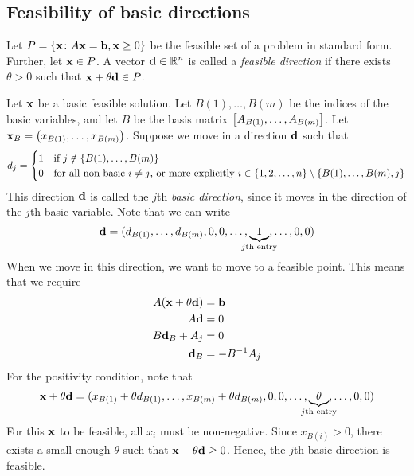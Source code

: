 \subsection{Feasibility of basic directions}
\begin{definition}
	Let \( P = \qty{\vb x \colon A \vb x = \vb b, \vb x \geq 0} \) be the feasible set of a problem in standard form.
	Further, let \( \vb x \in P \).
	A vector \( \vb d \in \mathbb R^n \) is called a \textit{feasible direction} if there exists \( \theta > 0 \) such that \( \vb x + \theta \vb d \in P \).
\end{definition}
Let \( \vb x \) be a basic feasible solution.
Let \( B(1), \dots, B(m) \) be the indices of the basic variables, and let \( B \) be the basis matrix \( \qty[A_{B(1)}, \dots, A_{B(m)}] \).
Let \( \vb x_B = \qty(x_{B(1)}, \dots, x_{B(m)}) \).
Suppose we move in a direction \( \vb d \) such that
\[
	d_j = \begin{cases}
		1 & \text{if } j \notin \qty{B(1), \dots, B(m)}                                                                             \\
		0 & \text{for all non-basic } i \neq j \text{, or more explicitly } i \in \qty{1,2,\dots,n}\setminus\qty{B(1),\dots,B(m),j} \\
	\end{cases}
\]
This direction \( \vb d \) is called the \( j \)th \textit{basic direction}, since it moves in the direction of the \( j \)th basic variable.
Note that we can write
\[
	\vb d = (d_{B(1)}, \dots, d_{B(m)}, 0, 0, \dots, \underbrace{1}_{\mathclap{j\text{th entry}}}, \dots, 0, 0)
\]
When we move in this direction, we want to move to a feasible point.
This means that we require
\begin{align*}
	A(\vb x + \theta \vb d) & = \vb b      \\
	A\vb d                  & = 0          \\
	B\vb d_B + A_j          & = 0          \\
	\vb d_B                 & = -B^{-1}A_j
\end{align*}
For the positivity condition, note that
\[
	\vb x + \theta \vb d = (x_{B(1)}+\theta d_{B(1)}, \dots, x_{B(m)}+\theta d_{B(m)}, 0, 0, \dots, \underbrace{\theta}_{\mathclap{j\text{th entry}}}, \dots, 0, 0)
\]
For this \( \vb x \) to be feasible, all \( x_i \) must be non-negative.
Since \( x_{B(i)} > 0 \), there exists a small enough \( \theta \) such that \( \vb x + \theta \vb d \geq 0 \).
Hence, the \( j \)th basic direction is feasible.

